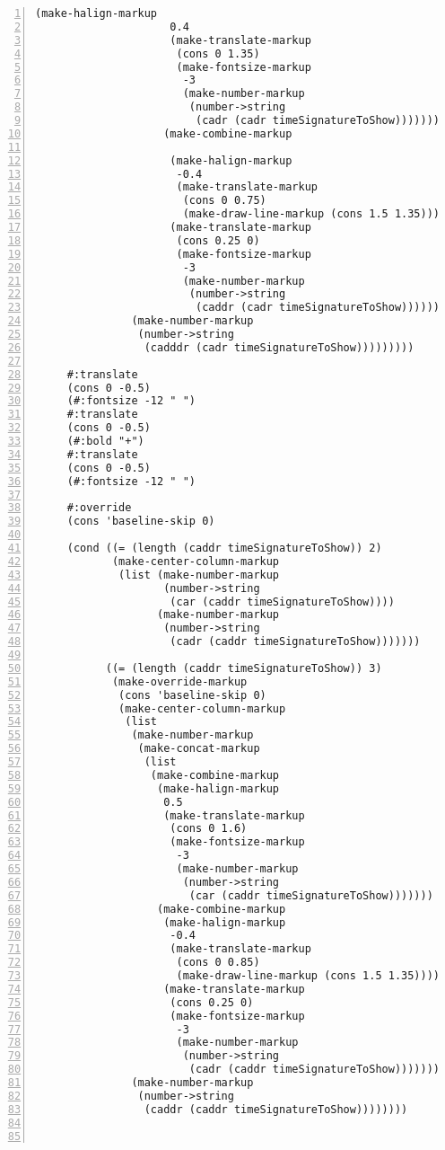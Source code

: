 \begin{Verbatim}[numbers=left,xleftmargin=5mm]
                    (make-halign-markup
                     0.4
                     (make-translate-markup
                      (cons 0 1.35)
                      (make-fontsize-markup
                       -3
                       (make-number-markup
                        (number->string
                         (cadr (cadr timeSignatureToShow)))))))
                    (make-combine-markup

                     (make-halign-markup
                      -0.4
                      (make-translate-markup
                       (cons 0 0.75)
                       (make-draw-line-markup (cons 1.5 1.35))))
                     (make-translate-markup
                      (cons 0.25 0)
                      (make-fontsize-markup
                       -3
                       (make-number-markup
                        (number->string
                         (caddr (cadr timeSignatureToShow))))))))))))
               (make-number-markup
                (number->string
                 (cadddr (cadr timeSignatureToShow)))))))))

     #:translate
     (cons 0 -0.5)
     (#:fontsize -12 " ")
     #:translate
     (cons 0 -0.5)
     (#:bold "+")
     #:translate
     (cons 0 -0.5)
     (#:fontsize -12 " ")

     #:override
     (cons 'baseline-skip 0)

     (cond ((= (length (caddr timeSignatureToShow)) 2)
            (make-center-column-markup
             (list (make-number-markup
                    (number->string
                     (car (caddr timeSignatureToShow))))
                   (make-number-markup
                    (number->string
                     (cadr (caddr timeSignatureToShow)))))))

           ((= (length (caddr timeSignatureToShow)) 3)
            (make-override-markup
             (cons 'baseline-skip 0)
             (make-center-column-markup
              (list
               (make-number-markup
                (make-concat-markup
                 (list
                  (make-combine-markup
                   (make-halign-markup
                    0.5
                    (make-translate-markup
                     (cons 0 1.6)
                     (make-fontsize-markup
                      -3
                      (make-number-markup
                       (number->string
                        (car (caddr timeSignatureToShow)))))))
                   (make-combine-markup
                    (make-halign-markup
                     -0.4
                     (make-translate-markup
                      (cons 0 0.85)
                      (make-draw-line-markup (cons 1.5 1.35))))
                    (make-translate-markup
                     (cons 0.25 0)
                     (make-fontsize-markup
                      -3
                      (make-number-markup
                       (number->string
                        (cadr (caddr timeSignatureToShow)))))))))))
               (make-number-markup
                (number->string
                 (caddr (caddr timeSignatureToShow))))))))



\end{Verbatim}
